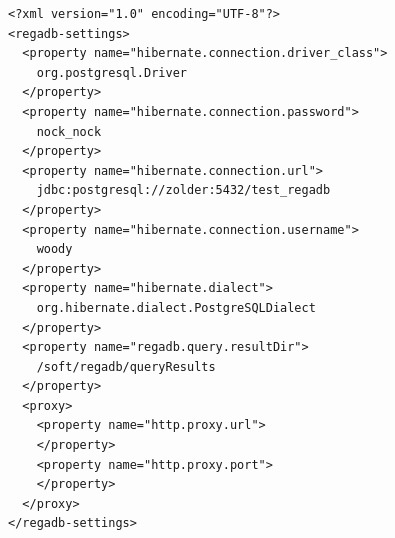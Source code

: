\begin{lstlisting}
<?xml version="1.0" encoding="UTF-8"?>
<regadb-settings>
  <property name="hibernate.connection.driver_class">
    org.postgresql.Driver
  </property>
  <property name="hibernate.connection.password">
    nock_nock
  </property>
  <property name="hibernate.connection.url">
    jdbc:postgresql://zolder:5432/test_regadb
  </property>
  <property name="hibernate.connection.username">
    woody
  </property>
  <property name="hibernate.dialect">
    org.hibernate.dialect.PostgreSQLDialect
  </property>
  <property name="regadb.query.resultDir">
    /soft/regadb/queryResults
  </property>
  <proxy>
    <property name="http.proxy.url">
    </property>
    <property name="http.proxy.port">
    </property>
  </proxy>
</regadb-settings>
\end{lstlisting}

